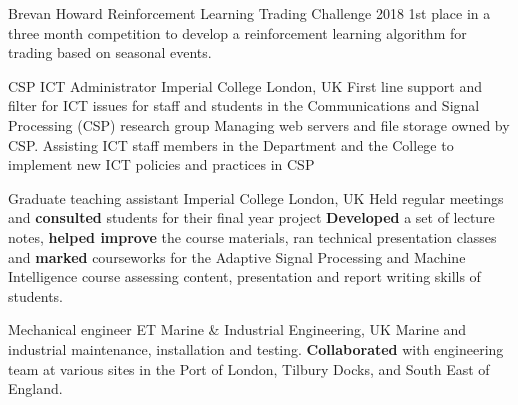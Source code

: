 \documentclass[10pt, a4paper]{article}
\begin{document}
{\begin{minipage}[c][0.95\textheight][t]{0.69\linewidth}
		\vspace{6pt}


					{Brevan Howard Reinforcement Learning Trading Challenge 2018}
					{}
					{1st place in a three month competition to develop a reinforcement learning algorithm for trading based on seasonal events.}
					{}

		\vspace{6pt}


					{CSP ICT Administrator}
					{Imperial College London, UK}
					{First line support and filter for ICT issues for staff and students in the Communications and Signal Processing (CSP) research group}
					{Managing web servers and file storage owned by CSP. Assisting ICT staff members in the Department and the College to implement new ICT policies and practices in CSP}

					{Graduate teaching assistant}
					{Imperial College London, UK}
					{Held regular meetings and \textbf{consulted} students for their final year project}
					{\textbf{Developed} a set of lecture notes, \textbf{helped improve} the course materials, ran technical presentation classes and \textbf{marked} courseworks for the Adaptive Signal Processing and Machine Intelligence course assessing content, presentation and report writing skills of students.}

					{Mechanical engineer}
					{ET Marine	\& Industrial Engineering, UK}
					{Marine and industrial maintenance, installation and testing.}
					{\textbf{Collaborated} with engineering team at various sites in the Port of London, Tilbury Docks, and South East of England.}



		\vspace{6pt}


\end{minipage}}
\end{document}
